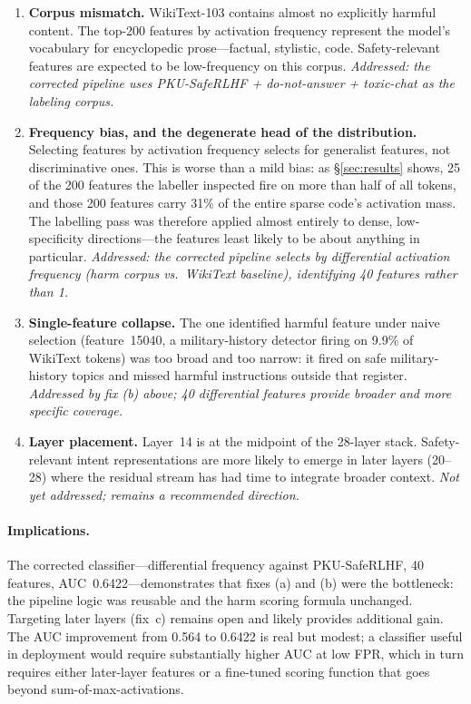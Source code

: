 \documentclass[11pt]{article}
\begin{document}
\begin{enumerate}
\item \textbf{Corpus mismatch.} WikiText-103 contains almost no explicitly harmful content. The top-200 features by activation frequency represent the model's vocabulary for encyclopedic prose---factual, stylistic, code. Safety-relevant features are expected to be low-frequency on this corpus. \emph{Addressed: the corrected pipeline uses PKU-SafeRLHF + do-not-answer + toxic-chat as the labeling corpus.}

\item \textbf{Frequency bias, and the degenerate head of the distribution.} Selecting features by activation frequency selects for generalist features, not discriminative ones. This is worse than a mild bias: as \S\ref{sec:results} shows, 25 of the 200 features the labeller inspected fire on more than half of all tokens, and those 200 features carry 31\% of the entire sparse code's activation mass. The labelling pass was therefore applied almost entirely to dense, low-specificity directions---the features least likely to be about anything in particular. \emph{Addressed: the corrected pipeline selects by differential activation frequency (harm corpus vs.\ WikiText baseline), identifying 40 features rather than 1.}

\item \textbf{Single-feature collapse.} The one identified harmful feature under naive selection (feature~15040, a military-history detector firing on 9.9\% of WikiText tokens) was too broad and too narrow: it fired on safe military-history topics and missed harmful instructions outside that register. \emph{Addressed by fix (b) above; 40 differential features provide broader and more specific coverage.}

\item \textbf{Layer placement.} Layer~14 is at the midpoint of the 28-layer stack. Safety-relevant intent representations are more likely to emerge in later layers (20--28) where the residual stream has had time to integrate broader context. \emph{Not yet addressed; remains a recommended direction.}
\end{enumerate}

\paragraph{Implications.} The corrected classifier---differential frequency against PKU-SafeRLHF, 40 features, AUC~0.6422---demonstrates that fixes (a) and (b) were the bottleneck: the pipeline logic was reusable and the harm scoring formula unchanged. Targeting later layers (fix~c) remains open and likely provides additional gain. The AUC improvement from 0.564 to 0.6422 is real but modest; a classifier useful in deployment would require substantially higher AUC at low FPR, which in turn requires either later-layer features or a fine-tuned scoring function that goes beyond sum-of-max-activations.
\end{document}
